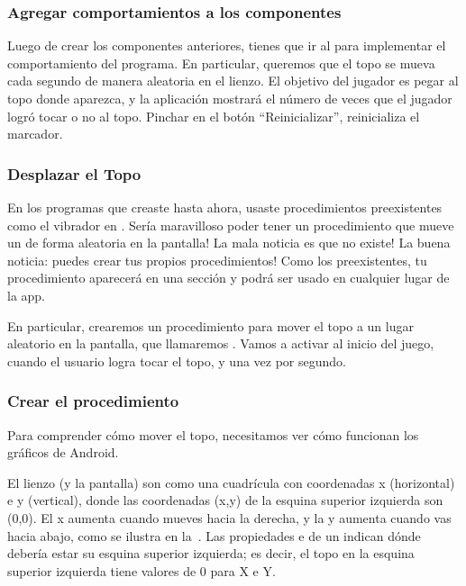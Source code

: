 \subsubsection*{Agregar comportamientos a los componentes}

Luego de crear los componentes anteriores, tienes que ir al
\blockEditor para implementar el comportamiento del programa. En
particular, queremos que el topo se mueva cada segundo de manera
aleatoria en el lienzo. El objetivo del jugador es pegar al topo donde
aparezca, y la aplicación mostrará el número de veces que el jugador
logró tocar o no al topo. Pinchar en el botón ``Reinicializar'',
reinicializa el marcador.

\subsubsection*{Desplazar el Topo}

En los programas que creaste hasta ahora, usaste procedimientos
preexistentes como el vibrador en . Sería
maravilloso poder tener un procedimiento que mueve un
 de forma aleatoria en la pantalla! La mala
noticia es que no existe! La buena noticia: puedes crear tus propios
procedimientos! Como los preexistentes, tu procedimiento aparecerá en
una sección y podrá ser usado en cualquier lugar de la app.

En particular, crearemos un procedimiento para mover el topo a un
lugar aleatorio en la pantalla, que llamaremos
. Vamos a activar  al inicio
del juego, cuando el usuario logra tocar el topo, y una vez por
segundo.

\subsubsection*{Crear el procedimiento }

Para comprender cómo mover el topo, necesitamos ver cómo funcionan los
gráficos de Android.

El lienzo (y la pantalla) son como una cuadrícula con coordenadas x
(horizontal) e y (vertical), donde las coordenadas (x,y) de la esquina
superior izquierda son (0,0). El x aumenta cuando mueves hacia la
derecha, y la y aumenta cuando vas hacia abajo, como se ilustra en
la~. Las propiedades  e 
de un  indican dónde debería estar su esquina
superior izquierda; es decir, el topo en la esquina superior izquierda
tiene valores de 0 para X e Y.


